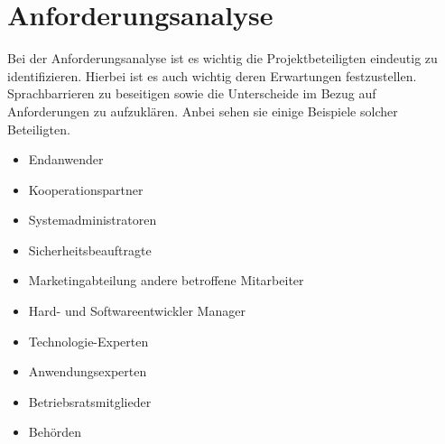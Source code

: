 \section{Anforderungsanalyse}
Bei der Anforderungsanalyse ist es wichtig die Projektbeteiligten eindeutig zu identifizieren. Hierbei ist es auch wichtig deren Erwartungen festzustellen. Sprachbarrieren zu beseitigen sowie die Unterscheide im Bezug auf Anforderungen zu aufzuklären. Anbei sehen sie einige Beispiele solcher Beteiligten. 
\begin{itemize}
\item Endanwender
\item Kooperationspartner
\item Systemadministratoren
\item Sicherheitsbeauftragte
\item Marketingabteilung andere betroffene Mitarbeiter
\item Hard- und Softwareentwickler Manager
\item Technologie-Experten
\item Anwendungsexperten
\item Betriebsratsmitglieder
\item Behörden
\end{itemize}

